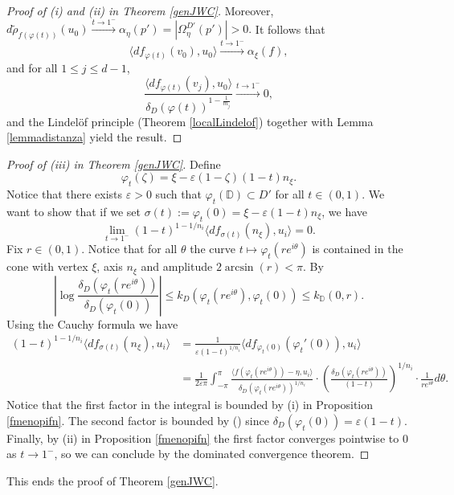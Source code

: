 \documentclass[11pt, reqno]{amsart}
\numberwithin{equation}{section}
\theoremstyle{definition}
\newcommand{\D}{\mathbb{D}}
\begin{document}
{{{\begin{proof}[Proof of (i) and (ii) in Theorem \ref{genJWC}]
			Moreover, $ d\tilde{\rho}_{f(\varphi(t))} (u_0)\stackrel{t\to 1^-}\to \alpha_\eta(p')= |\Omega_\eta^{D'}(p')|>0.$
			It follows that 
			$$\langle df_{\varphi(t)}(v_0),u_0  \rangle \stackrel{t\to 1^-}\to\alpha_\xi(f),$$ and for all $1\leq j\leq d-1$,
			$$\frac{\langle df_{\varphi(t)}(v_j),u_0   \rangle}{\delta_D(\varphi(t))^{1-\frac{1}{m_j}}} \stackrel{t\to 1^-}\to 0,$$
			and the Lindel\"of principle (Theorem \ref{localLindelof}) together with Lemma \ref{lemmadistanza} yield the result.
			
			
		\end{proof}
		
		
		
		\begin{proof}[Proof of (iii) in Theorem \ref{genJWC}] 
			Define $$\varphi_t(\zeta)=\xi-\varepsilon(1-\zeta)(1-t)n_\xi.$$
			Notice that there exists $\varepsilon>0$ such that $\varphi_t(\D)\subset D'$ for all $t\in(0,1)$. We want to show that if we set $\sigma(t):=\varphi_t(0)=\xi-\varepsilon(1-t)n_\xi$, we have
			$$\lim_{t\to 1^-}(1-t)^{1-1/n_i}\langle df_{\sigma(t)}(n_\xi),u_i\rangle=0.$$
			Fix $r\in(0,1)$. Notice that for all $\theta$ the curve $t\mapsto\varphi_t(re^{i\theta})$ is contained in the cone 
			with vertex $\xi$, axis $ n_\xi$ and amplitude $2\arcsin(r)<\pi$.
			By \cite[Proposition 2.4]{Mercer}
			\begin{equation}\label{ultimosforzo}
				\left|\log\frac{\delta_D(\varphi_t(re^{i\theta}))}{\delta_D(\varphi_t(0))}\right|\leq k_D(\varphi_t(re^{i\theta}),\varphi_t(0))\leq k_\D(0,r).
			\end{equation}
			Using the Cauchy formula we have 
			\begin{align*}(1-t)^{1-1/n_i}\langle df_{\sigma(t)}(n_\xi),u_i\rangle&=\frac{1}{\varepsilon(1-t)^{1/n_i}}\langle df_{\varphi_t(0)}(\varphi_t'(0)),u_i\rangle\\&=\frac{1}{2\varepsilon\pi}\int_{-\pi}^{\pi}\frac{\langle f(\varphi_t(re^{i\theta}))-\eta,u_i\rangle}{\delta_D(\varphi_t(re^{i\theta}))^{1/n_i}}\cdot\left(\frac{\delta_D(\varphi_t(re^{i\theta}))}{(1-t)}\right)^{1/n_i}\cdot\frac{1}{ re^{i\theta}}d\theta.
			\end{align*}
			Notice that the first factor in the integral is bounded by (i) in Proposition \ref{fmenopifn}. The second factor  is bounded by () since  $\delta_D(\varphi_t(0))=\varepsilon(1-t)$. Finally, by (ii) in Proposition \ref{fmenopifn} the first factor converges pointwise to $0$ as $t\to 1^-$, so we can conclude by the dominated convergence theorem.
		\end{proof}
		This ends the proof of Theorem \ref{genJWC}.
 
}}}
\end{document}

